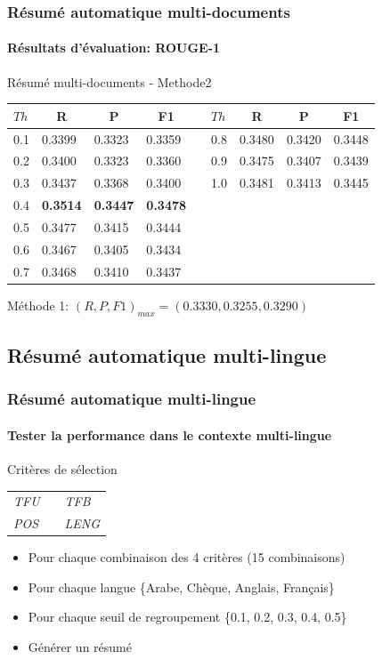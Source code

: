 \documentclass{beamer}
\begin{document}
\begin{frame}
\frametitle{Résumé automatique multi-documents}
\framesubtitle{Résultats d'évaluation: ROUGE-1}

\begin{block}{Résumé multi-documents - Methode2}
\scriptsize
\begin{center}
\begin{tabular}{lllllllll} 
\hline \hline
$ Th $	& \multicolumn{1}{c}{R}		& \multicolumn{1}{c}{P}	& \multicolumn{1}{c}{F1} && $ Th $	& \multicolumn{1}{c}{R}		& \multicolumn{1}{c}{P}	& \multicolumn{1}{c}{F1} \\
\hline
0.1	& 0.3399	& 0.3323	& 0.3359	&& 0.8	& 0.3480	& 0.3420	& 0.3448	 \\
0.2	& 0.3400	& 0.3323	& 0.3360	&& 0.9	& 0.3475	& 0.3407	& 0.3439	\\
0.3	& 0.3437	& 0.3368	& 0.3400	&& 1.0	& 0.3481	& 0.3413	& 0.3445	 \\
0.4	& \textbf{0.3514}	& \textbf{0.3447}	& \textbf{0.3478}	 &&&&& \\
0.5	& 0.3477	& 0.3415	& 0.3444	&&&&& \\
0.6	& 0.3467	& 0.3405	& 0.3434	&&&&& \\
0.7	& 0.3468	& 0.3410	& 0.3437	&&&&& \\
\hline \hline
\end{tabular}
\end{center}
\end{block}
Méthode 1: $ (R, P, F1)_{max}=(0.3330, 0.3255, 0.3290) $
\end{frame}

\subsection{Résumé automatique multi-lingue}

\begin{frame}
\frametitle{Résumé automatique multi-lingue}
\framesubtitle{Tester la performance dans le contexte multi-lingue}

\begin{block}{Critères de sélection}
\begin{center}
\begin{tabular}{lll}
\textit{TFU} && \textit{TFB} \\
\textit{POS} && \textit{LENG} \\
\end{tabular}
\end{center}
\end{block}

\begin{itemize}
\item Pour chaque combinaison des 4 critères (15 combinaisons)
\item Pour chaque langue \{Arabe, Chèque, Anglais, Français\}
\item Pour chaque seuil de regroupement \{0.1, 0.2, 0.3, 0.4, 0.5\}
\item Générer un résumé
\end{itemize}

\end{frame}
\end{document}
